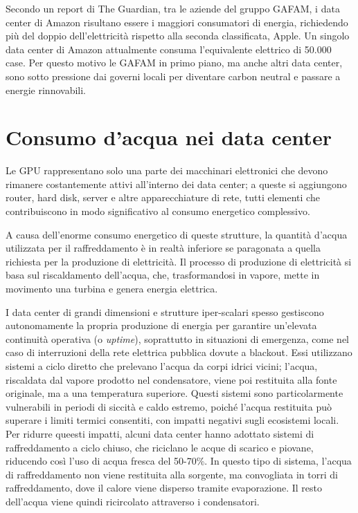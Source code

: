 \documentclass[12pt,a4paper,oneside]{book}
\begin{document}
Secondo un report di The Guardian\cite{guardian2024datacenters}, tra le aziende del gruppo GAFAM, i data center di Amazon risultano essere i maggiori consumatori di energia, richiedendo più del doppio dell'elettricità rispetto alla seconda classificata, Apple. Un singolo data center di Amazon attualmente consuma l'equivalente elettrico di 50.000 case. Per questo motivo le GAFAM in primo piano, ma anche altri data center, sono sotto pressione dai governi locali per diventare carbon neutral e passare a energie rinnovabili.

\chapter{Consumo d'acqua nei data center}

Le GPU rappresentano solo una parte dei macchinari elettronici che devono rimanere costantemente attivi all'interno dei data center; a queste si aggiungono router, hard disk, server e altre apparecchiature di rete, tutti elementi che contribuiscono in modo significativo al consumo energetico complessivo.

A causa dell'enorme consumo energetico di queste strutture, la quantità d'acqua utilizzata per il raffreddamento è in realtà inferiore se paragonata a quella richiesta per la produzione di elettricità. Il processo di produzione di elettricità si basa sul riscaldamento dell'acqua, che, trasformandosi in vapore, mette in movimento una turbina e genera energia elettrica.

I data center di grandi dimensioni e strutture iper-scalari spesso gestiscono autonomamente la propria produzione di energia per garantire un'elevata continuità operativa (o \textit{uptime}), soprattutto in situazioni di emergenza, come nel caso di interruzioni della rete elettrica pubblica dovute a blackout.
Essi utilizzano sistemi a ciclo diretto che prelevano l'acqua da corpi idrici vicini; l'acqua, riscaldata dal vapore prodotto nel condensatore, viene poi restituita alla fonte originale, ma a una temperatura superiore. Questi sistemi sono particolarmente vulnerabili in periodi di siccità e caldo estremo, poiché l'acqua restituita può superare i limiti termici consentiti, con impatti negativi sugli ecosistemi locali.
Per ridurre queesti impatti, alcuni data center hanno adottato sistemi di raffreddamento a ciclo chiuso, che riciclano le acque di scarico e piovane, riducendo così l'uso di acqua fresca del 50-70\%. In questo tipo di sistema, l'acqua di raffreddamento non viene restituita alla sorgente, ma convogliata in torri di raffreddamento, dove il calore viene disperso tramite evaporazione. Il resto dell'acqua viene quindi ricircolato attraverso i condensatori.
\end{document}

